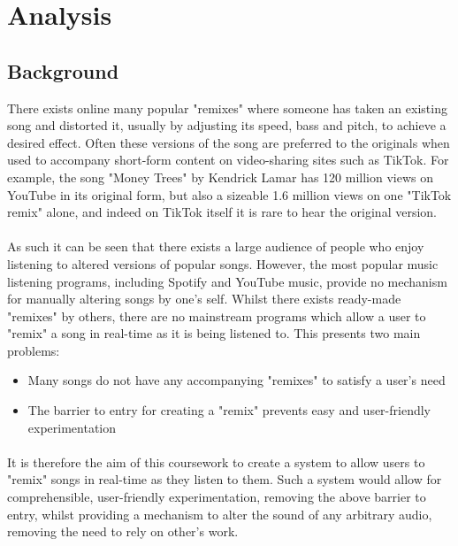 \section{Analysis}
\subsection{Background}
There exists online many popular "remixes"  where someone has taken an existing song and distorted it, usually by adjusting its speed, bass and pitch, to achieve a desired effect. Often these versions of the song are preferred to the originals when used to accompany short-form content on video-sharing sites such as TikTok. For example,  the song "Money Trees" by Kendrick Lamar has 120 million views on YouTube  in its original form, but also a sizeable 1.6 million views on one "TikTok remix" alone, and indeed on TikTok itself it is rare to hear the original version.

\paragraph{}
As such it can be seen that there exists a large audience of people who enjoy listening to altered versions of popular songs. However, the most popular music listening programs, including Spotify and YouTube music, provide no mechanism for manually altering songs by one's self. Whilst there exists ready-made "remixes" by others, there are no mainstream programs which allow a user to "remix" a song in real-time as it is being listened to. This presents two main problems:

\begin{itemize}
	\item Many songs do not have any accompanying "remixes" to satisfy a user's need
	\item The barrier to entry for creating a "remix" prevents easy and user-friendly experimentation
\end{itemize}

\paragraph{}
It is therefore the aim of this coursework to create a system to allow users to "remix" songs in real-time as they listen to them. Such a system would allow for comprehensible, user-friendly experimentation, removing the above barrier to entry, whilst providing a mechanism to alter the sound of any arbitrary audio, removing the need to rely on other's work.


